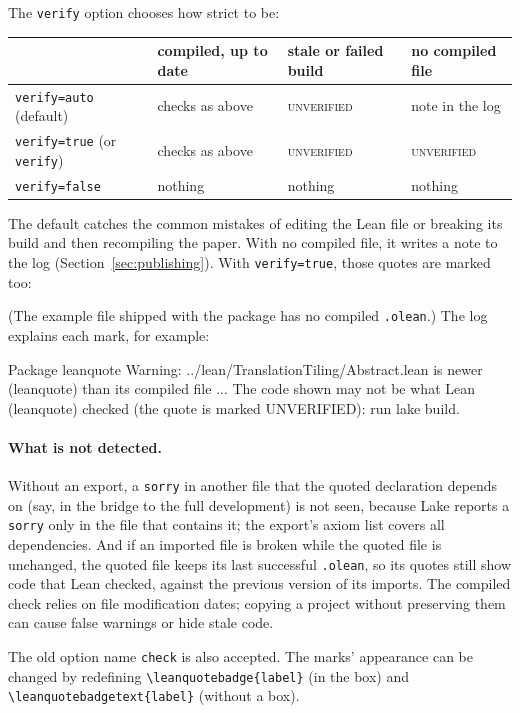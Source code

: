 \documentclass[11pt]{article}
\newcommand{\cs}[1]{\texttt{\textbackslash #1}}
\newcommand{\opt}[1]{\texttt{#1}}
\begin{document}
The \opt{verify} option chooses how strict to be:
\begin{center}
\begin{tabular}{@{}llll@{}}
\toprule
& compiled, up to date & stale or failed build & no compiled file \\
\midrule
\opt{verify=auto} (default) & checks as above & \textsc{unverified} & note in the log \\
\opt{verify=true} (or \opt{verify}) & checks as above & \textsc{unverified} & \textsc{unverified} \\
\opt{verify=false} & nothing & nothing & nothing \\
\bottomrule
\end{tabular}
\end{center}
The default catches the common mistakes of editing the Lean file or breaking its build and then
recompiling the paper. With no compiled file, it writes a note to the log
(Section~\ref{sec:publishing}). With \opt{verify=true}, those quotes are marked too:


\noindent (The example file shipped with the package has no compiled \texttt{.olean}.)
The log explains each mark, for example:
\begin{latexsrc}
Package leanquote Warning: ../lean/TranslationTiling/Abstract.lean is newer
(leanquote)  than its compiled file ... The code shown may not be what Lean
(leanquote)  checked (the quote is marked UNVERIFIED): run lake build.
\end{latexsrc}

\paragraph{What is not detected.} Without an export, a \texttt{sorry} in another file that the
quoted declaration depends on (say, in the bridge to the full development) is not seen, because
Lake reports a \texttt{sorry} only in the file that contains it; the export's axiom list covers
all dependencies. And if an imported file is broken while the quoted file is unchanged, the quoted
file keeps its last successful \texttt{.olean}, so its quotes still show code that Lean checked,
against the previous version of its imports.
The compiled check relies on file modification dates; copying a project without
preserving them can cause false warnings or hide stale code.

The old option name \opt{check} is also accepted. The marks' appearance can be changed by
redefining \cs{leanquotebadge}\verb|{label}| (in the box) and \cs{leanquotebadgetext}\verb|{label}|
(without a box).
\end{document}
